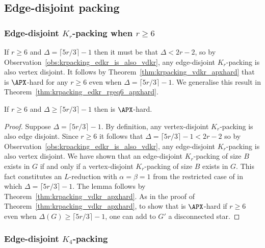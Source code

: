 \subsection{Edge-disjoint packing} 

\subsubsection{Edge-disjoint \texorpdfstring{$K_r$}{Kr}-packing when \texorpdfstring{$r \geq 6$}{r >= 6}}

If $r \geq 6$ and $\Delta = \lceil 5r/3 \rceil - 1$ then it must be that $\Delta < 2r - 2$, so by Observation~\ref{obs:krpacking_edkr_is_also_vdkr}, any edge-disjoint $K_r$-packing is also vertex disjoint. It follows by Theorem~\ref{thm:krpacking_vdkr_apxhard} that \edkr is $\APX$-hard for any $r \geq 6$ even when $\Delta = \lceil 5r/3 \rceil - 1$. We generalise this result in Theorem~\ref{thm:krpacking_edkr_rgeq6_apxhard}.


\begin{thm}
\label{thm:krpacking_edkr_rgeq6_apxhard}
If $r \geq 6$ and $\Delta \geq \lceil 5r/3 \rceil - 1$ then \edkr is $\APX$-hard.
\end{thm}
\begin{proof}
Suppose $\Delta = \lceil 5r/3 \rceil - 1$. By definition, any vertex-disjoint $K_r$-packing is also edge disjoint. Since $r \geq 6$ it follows that $\Delta = \lceil 5r/3 \rceil - 1 < 2r - 2$ so by Observation~\ref{obs:krpacking_edkr_is_also_vdkr}, any edge-disjoint $K_r$-packing is also vertex disjoint. We have shown that an edge-disjoint $K_r$-packing of size $B$ exists in $G$ if and only if a vertex-disjoint $K_r$-packing of size $B$ exists in $G$. This fact constitutes an $L$-reduction with $\alpha=\beta=1$ from the restricted case of \vdkr in which $\Delta = \lceil 5r/3 \rceil - 1$. The lemma follows by Theorem~\ref{thm:krpacking_vdkr_apxhard}. As in the proof of Theorem~\ref{thm:krpacking_vdkr_apxhard}, to show that \edkr is $\APX$-hard if $r\geq 6$ even when $\Delta(G) \geq \lceil 5r/3 \rceil - 1$, one can add to $G'$ a disconnected star.
\end{proof}

\subsubsection{Edge-disjoint \texorpdfstring{$K_4$}{K4}-packing} 
\label{sec:krpacking_edkfour}

